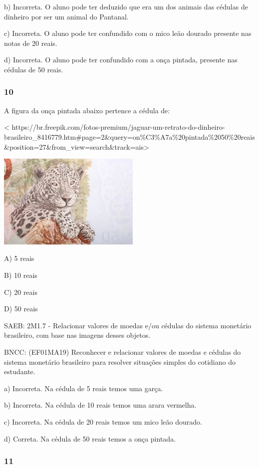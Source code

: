 \begin{itemize}
\begin{itemize}
b) Incorreta. O aluno pode ter deduzido que era um dos animais das
cédulas de dinheiro por ser um animal do Pantanal.

c) Incorreta. O aluno pode ter confundido com o mico leão dourado
presente nas notas de 20 reais.

d) Incorreta. O aluno pode ter confundido com a onça pintada, presente
nas cédulas de 50 reais.

\subsubsection{10 }\label{section-141}

A figura da onça pintada abaixo pertence a cédula de:

\textless{}
https://br.freepik.com/fotos-premium/jaguar-um-retrato-do-dinheiro-brasileiro\_8416779.htm\#page=2\&query=on\%C3\%A7a\%20pintada\%2050\%20reais\&position=27\&from\_view=search\&track=ais\textgreater{}

\includegraphics[width=2.68408in,height=1.78802in]{media/image157.jpg}

A) 5 reais

B) 10 reais

C) 20 reais

D) 50 reais

SAEB: 2M1.7 - Relacionar valores de moedas e/ou cédulas do sistema
monetário brasileiro, com base nas imagens desses objetos.

BNCC: (EF01MA19) Reconhecer e relacionar valores de moedas e cédulas do
sistema monetário brasileiro para resolver situações simples do
cotidiano do estudante.

a) Incorreta. Na cédula de 5 reais temos uma garça.

b) Incorreta. Na cédula de 10 reais temos uma arara vermelha.

c) Incorreta. Na cédula de 20 reais temos um mico leão dourado.

d) Correta. Na cédula de 50 reais temos a onça pintada.

\subsubsection{11 }\label{section-142}


\end{itemize}
\end{itemize}
